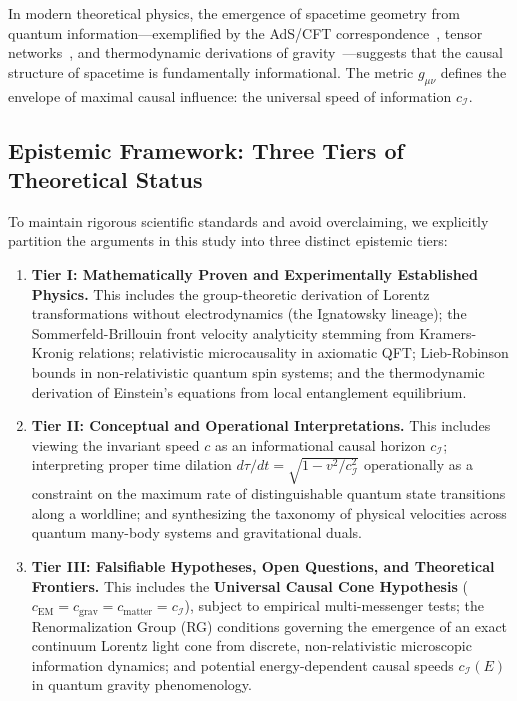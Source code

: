 \documentclass[11pt,a4paper]{article}
\begin{document}
In modern theoretical physics, the emergence of spacetime geometry from quantum information---exemplified by the AdS/CFT correspondence~\cite{maldacena1998}, tensor networks~\cite{pastawski2015}, and thermodynamic derivations of gravity~\cite{jacobson1995,jacobson2016,faulkner2014}---suggests that the causal structure of spacetime is fundamentally informational. The metric $g_{\mu\nu}$ defines the envelope of maximal causal influence: the universal speed of information $c_{\mathcal{I}}$.

\subsection{Epistemic Framework: Three Tiers of Theoretical Status}

To maintain rigorous scientific standards and avoid overclaiming, we explicitly partition the arguments in this study into three distinct epistemic tiers:
\begin{enumerate}
    \item \textbf{Tier I: Mathematically Proven and Experimentally Established Physics.} 
    This includes the group-theoretic derivation of Lorentz transformations without electrodynamics (the Ignatowsky lineage); the Sommerfeld-Brillouin front velocity analyticity stemming from Kramers-Kronig relations; relativistic microcausality in axiomatic QFT; Lieb-Robinson bounds in non-relativistic quantum spin systems; and the thermodynamic derivation of Einstein's equations from local entanglement equilibrium.
    \item \textbf{Tier II: Conceptual and Operational Interpretations.}
    This includes viewing the invariant speed $c$ as an informational causal horizon $c_{\mathcal{I}}$; interpreting proper time dilation $d\tau/dt = \sqrt{1 - v^2/c_{\mathcal{I}}^2}$ operationally as a constraint on the maximum rate of distinguishable quantum state transitions along a worldline; and synthesizing the taxonomy of physical velocities across quantum many-body systems and gravitational duals.
    \item \textbf{Tier III: Falsifiable Hypotheses, Open Questions, and Theoretical Frontiers.}
    This includes the \textbf{Universal Causal Cone Hypothesis} ($c_{\text{EM}} = c_{\text{grav}} = c_{\text{matter}} = c_{\mathcal{I}}$), subject to empirical multi-messenger tests; the Renormalization Group (RG) conditions governing the emergence of an exact continuum Lorentz light cone from discrete, non-relativistic microscopic information dynamics; and potential energy-dependent causal speeds $c_{\mathcal{I}}(E)$ in quantum gravity phenomenology.
\end{enumerate}
\end{document}
